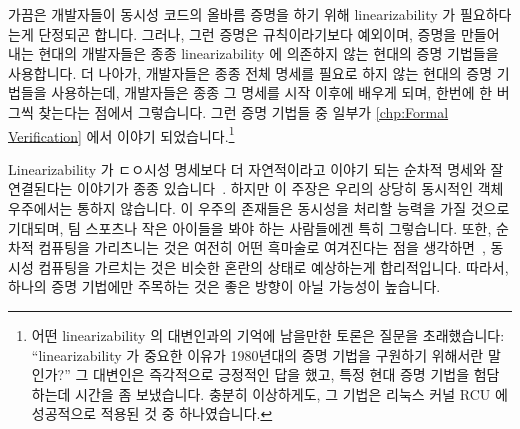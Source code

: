 \fi

가끔은 개발자들이 동시성 코드의 올바름 증명을 하기 위해 linearizability 가
필요하다는게 단정되곤 합니다.
그러나, 그런 증명은 규칙이라기보다 예외이며, 증명을 만들어내는 현대의
개발자들은 종종 linearizability 에 의존하지 않는 현대의 증명 기법들을
사용합니다.
더 나아가, 개발자들은 종종 전체 명세를 필요로 하지 않는 현대의 증명 기법들을
사용하는데, 개발자들은 종종 그 명세를 시작 이후에 배우게 되며, 한번에 한 버그씩
찾는다는 점에서 그렇습니다.
그런 증명 기법들 중 일부가
\cref{chp:Formal Verification} 에서 이야기 되었습니다.\footnote{
	어떤 linearizability 의 대변인과의 기억에 남을만한 토론은 질문을
	초래했습니다:
	``linearizability 가 중요한 이유가 1980년대의 증명 기법을 구원하기
	위해서란 말인가?''
	그 대변인은 즉각적으로 긍정적인 답을 했고, 특정 현대 증명 기법을
	험담하는데 시간을 좀 보냈습니다.
	충분히 이상하게도, 그 기법은 리눅스 커널 RCU 에 성공적으로 적용된 것 중
	하나였습니다.}

\iffalse

It is sometimes asserted that linearizability is necessary for developers
to produce proofs of correctness for their concurrent code.
However, such proofs are the exception rather than the rule, and modern
developers who do produce proofs often use modern proof techniques that
do not depend on linearizability.
Furthermore, developers frequently use modern proof techniques that do
not require a full specification, given that developers often learn
their specification after the fact, one bug at a time.
A few such proof techniques were discussed in
\cref{chp:Formal Verification}.\footnote{
	A memorable verbal discussion with an advocate of linearizability
	resulted in question:
	``So the reason linearizability is important is to rescue 1980s
	proof techniques?''
	The advocate immediately replied in the affirmative, then spent
	some time disparaging a particular modern proof technique.
	Oddly enough, that technique was one of those successfully
	applied to Linux-kernel RCU\@.}

\fi

Linearizability 가 ㄷㅇ시성 명세보다 더 자연적이라고 이야기 되는 순차적 명세와
잘 연결된다는 이야기가 종종
있습니다~\cite{SergioRajsbaum2020HistoryLinearizability}.
하지만 이 주장은 우리의 상당히 동시적인 객체 우주에서는 통하지 않습니다.
이 우주의 존재들은 동시성을 처리할 능력을 가질 것으로 기대되며, 팀 스포츠나
작은 아이들을 봐야 하는 사람들에겐 특히 그렇습니다.
또한, 순차적 컴퓨팅을 가리츠니는 것은 여전히 어떤 흑마술로 여겨진다는 점을
생각하면~\cite{ElizabethPatitsas2020GradesNotBimodal}, 동시성 컴퓨팅을 가르치는
것은 비슷한 혼란의 상태로 예상하는게 합리적입니다.
따라서, 하나의 증명 기법에만 주목하는 것은 좋은 방향이 아닐 가능성이 높습니다.

